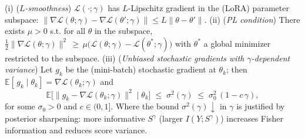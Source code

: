 \documentclass[preprint,12pt]{elsarticle}
\def\textit#1{#1}%
\begin{document}
\begin{assumption}
\label{assump:PL-Lsmooth-noise}
(i) (\emph{$L$-smoothness}) $\mathcal{L}(\cdot;\gamma)$ has $L$-Lipschitz gradient in the (LoRA) parameter subspace:
$\|\nabla \mathcal{L}(\theta;\gamma)-\nabla \mathcal{L}(\theta';\gamma)\|\le L\|\theta-\theta'\|$. 
(ii) (\emph{PL condition}) There exists $\mu>0$ s.t. for all $\theta$ in the subspace,
$\frac{1}{2}\|\nabla \mathcal{L}(\theta;\gamma)\|^2 \,\ge\, \mu\bigl(\mathcal{L}(\theta;\gamma)-\mathcal{L}(\theta^\ast;\gamma)\bigr)$
with $\theta^\ast$ a global minimizer restricted to the subspace. 
(iii) (\emph{Unbiased stochastic gradients with $\gamma$-dependent variance})
Let $g_k$ be the (mini-batch) stochastic gradient at $\theta_k$; then
$\mathbb{E}[\,g_k\mid \theta_k]=\nabla \mathcal{L}(\theta_k;\gamma)$ and
\[
\mathbb{E}\!\bigl[\|g_k-\nabla \mathcal{L}(\theta_k;\gamma)\|^2 \mid \theta_k\bigr]
\;\le\; \sigma^2(\gamma) \;\le\; \sigma_0^2\,(1-c\,\gamma),
\]
for some $\sigma_0>0$ and $c\in(0,1]$.
\textit{Where} the bound $\sigma^2(\gamma)\!\downarrow$ in $\gamma$ is justified by posterior sharpening:
more informative $S^\gamma$ (larger $I(Y;S^\gamma)$) increases Fisher information and reduces score variance.
\end{assumption}
\end{document}
